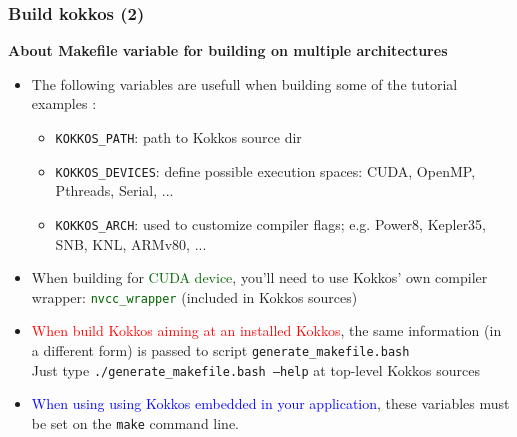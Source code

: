 \begin{frame}
  \frametitle{Build kokkos (2)}

  \textbf{About Makefile variable for building on multiple architectures}

  \begin{itemize}
  \item The following variables are usefull when building some of the tutorial examples :
    \begin{itemize}
    \item \texttt{KOKKOS\_PATH}: path to Kokkos source dir
    \item \texttt{KOKKOS\_DEVICES}: define possible execution spaces: CUDA, OpenMP, Pthreads, Serial, ...
    \item \texttt{KOKKOS\_ARCH}: used to customize compiler flags; e.g. Power8, Kepler35, SNB, KNL, ARMv80, ...
    \end{itemize}
  \item When building for \textcolor{darkgreen}{CUDA device}, you'll need to use Kokkos' own compiler wrapper: \textcolor{darkgreen}{\texttt{nvcc\_wrapper}} (included in Kokkos sources)
  \item \textcolor{red}{When build Kokkos aiming at an installed Kokkos}, the same information (in a different form) is passed to script \texttt{generate\_makefile.bash}\\
    Just type \texttt{./generate\_makefile.bash --help} at top-level Kokkos sources
  \item \textcolor{blue}{When using using Kokkos embedded in your application}, these variables must be set on the \texttt{make} command line.
  \end{itemize}
  
\end{frame}
  

